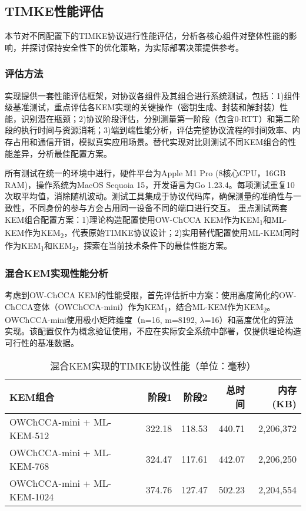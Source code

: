 \subsection{TIMKE性能评估}

本节对不同配置下的TIMKE协议进行性能评估，分析各核心组件对整体性能的影响，并探讨保持安全性下的优化策略，为实际部署决策提供参考。

\subsubsection{评估方法}

实现提供一套性能评估框架，对协议各组件及其组合进行系统测试，包括：1)组件级基准测试，重点评估各KEM实现的关键操作（密钥生成、封装和解封装）性能，识别潜在瓶颈；2)协议阶段评估，分别测量第一阶段（包含0-RTT）和第二阶段的执行时间与资源消耗；3)端到端性能分析，评估完整协议流程的时间效率、内存占用和通信开销，模拟真实应用场景。替代实现对比则测试不同KEM组合的性能差异，分析最佳配置方案。

所有测试在统一的环境中进行，硬件平台为Apple M1 Pro (8核心CPU，16GB RAM)，操作系统为MacOS Sequoia 15，开发语言为Go 1.23.4。每项测试重复10次取平均值，消除随机波动。测试工具集成于协议代码库，确保测量的准确性与一致性，不同身份的参与方会占用同一设备不同的端口进行交互。
重点测试两套KEM组合配置方案：1)理论构造配置使用OW-ChCCA KEM作为KEM\textsubscript{1}和ML-KEM作为KEM\textsubscript{2}，代表原始TIMKE协议设计；2)实用替代配置使用ML-KEM同时作为KEM\textsubscript{1}和KEM\textsubscript{2}，探索在当前技术条件下的最佳性能方案。

\subsubsection{混合KEM实现性能分析}

考虑到OW-ChCCA KEM的性能受限，首先评估折中方案：使用高度简化的OW-ChCCA变体（OWChCCA-mini）作为KEM\textsubscript{1}，结合ML-KEM作为KEM\textsubscript{2}。OWChCCA-mini使用极小矩阵维度（n=16, m=8192, $\lambda$=16）和高度优化的算法实现。该配置仅作为概念验证使用，不应在实际安全系统中部署，仅提供理论构造可行性的基准数据。

\begin{table}[ht]
\centering
\caption{混合KEM实现的TIMKE协议性能（单位：毫秒）}
\label{tab:timke-hybrid-perf}
\begin{tabular}{|l|r|r|r|r|}
\hline
\textbf{KEM组合} & \textbf{阶段1} & \textbf{阶段2} & \textbf{总时间} & \textbf{内存(KB)} \\
\hline
OWChCCA-mini + ML-KEM-512    & 322.18  & 118.53  & 440.71  & 2,206,372   \\
\hline
OWChCCA-mini + ML-KEM-768    & 324.47  & 117.61  & 442.07  & 2,206,250   \\
\hline
OWChCCA-mini + ML-KEM-1024   & 374.76  & 127.47  & 502.23  & 2,204,554   \\
\hline
\end{tabular}
\end{table}

